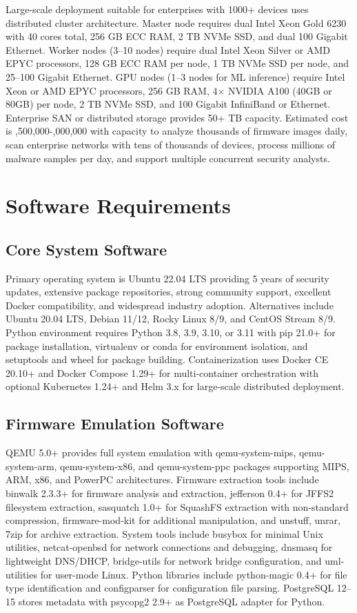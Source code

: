 Large-scale deployment suitable for enterprises with 1000+ devices uses distributed cluster architecture. Master node requires dual Intel Xeon Gold 6230 with 40 cores total, 256 GB ECC RAM, 2 TB NVMe SSD, and dual 100 Gigabit Ethernet. Worker nodes (3--10 nodes) require dual Intel Xeon Silver or AMD EPYC processors, 128 GB ECC RAM per node, 1 TB NVMe SSD per node, and 25--100 Gigabit Ethernet. GPU nodes (1--3 nodes for ML inference) require Intel Xeon or AMD EPYC processors, 256 GB RAM, 4$\times$ NVIDIA A100 (40GB or 80GB) per node, 2 TB NVMe SSD, and 100 Gigabit InfiniBand or Ethernet. Enterprise SAN or distributed storage provides 50+ TB capacity. Estimated cost is ,500,000-,000,000 with capacity to analyze thousands of firmware images daily, scan enterprise networks with tens of thousands of devices, process millions of malware samples per day, and support multiple concurrent security analysts.

\section{Software Requirements}

\subsection{Core System Software}

Primary operating system is Ubuntu 22.04 LTS providing 5 years of security updates, extensive package repositories, strong community support, excellent Docker compatibility, and widespread industry adoption. Alternatives include Ubuntu 20.04 LTS, Debian 11/12, Rocky Linux 8/9, and CentOS Stream 8/9. Python environment requires Python 3.8, 3.9, 3.10, or 3.11 with pip 21.0+ for package installation, virtualenv or conda for environment isolation, and setuptools and wheel for package building. Containerization uses Docker CE 20.10+ and Docker Compose 1.29+ for multi-container orchestration with optional Kubernetes 1.24+ and Helm 3.x for large-scale distributed deployment.

\subsection{Firmware Emulation Software}

QEMU 5.0+ provides full system emulation with qemu-system-mips, qemu-system-arm, qemu-system-x86, and qemu-system-ppc packages supporting MIPS, ARM, x86, and PowerPC architectures. Firmware extraction tools include binwalk 2.3.3+ for firmware analysis and extraction, jefferson 0.4+ for JFFS2 filesystem extraction, sasquatch 1.0+ for SquashFS extraction with non-standard compression, firmware-mod-kit for additional manipulation, and unstuff, unrar, 7zip for archive extraction. System tools include busybox for minimal Unix utilities, netcat-openbsd for network connections and debugging, dnsmasq for lightweight DNS/DHCP, bridge-utils for network bridge configuration, and uml-utilities for user-mode Linux. Python libraries include python-magic 0.4+ for file type identification and configparser for configuration file parsing. PostgreSQL 12--15 stores metadata with psycopg2 2.9+ as PostgreSQL adapter for Python.

